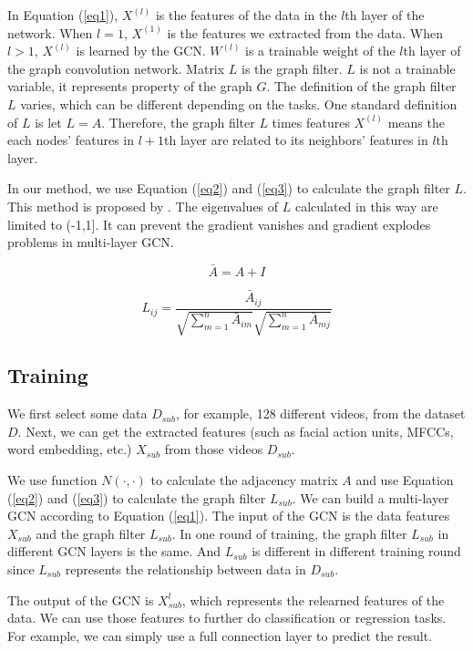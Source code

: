 \documentclass[11pt]{article}
\begin{document}
In Equation (\ref{eq1}), $X^{(l)}$ is the features of the data in the $l$th layer of the network.
When $l = 1$, $X^{(1)}$ is the features we extracted from the data. When $l>1$, $X^{(l)}$ is learned by the GCN.
$W^{(l)}$ is a trainable weight of the $l$th layer of the graph convolution network.
Matrix $L$ is the graph filter. $L$ is not a trainable variable, it represents property of the graph $G$. The definition of the graph filter $L$ varies, which can be different depending on the tasks. One standard definition of $L$ is let $L = A$. Therefore, the graph filter $L$ times features $X^{(l)}$ means the each nodes' features in $l+1$th layer are related to its neighbors' features in $l$th layer.

In our method, we use Equation (\ref{eq2}) and (\ref{eq3}) to calculate the graph filter $L$.
This method is proposed by \cite{kipf2017semi}. 
The eigenvalues of $L$ calculated in this way are limited to (-1,1]. It can prevent the 
gradient vanishes and gradient explodes problems in multi-layer GCN.

\begin{equation}
\bar{A}= A + I
\label{eq2}
\end{equation}

\begin{equation}
L_{ij}=\frac{\bar{A}_{ij}}{\sqrt{\sum_{m=1}^{n} \bar{A}_{im}}
\sqrt{\sum_{m=1}^{n} \bar{A}_{mj}}} 
\label{eq3}
\end{equation}

\subsection{Training}
We first select some data $D_{sub}$, for example, 128 different videos, from the dataset $D$. Next, we can
get the extracted features (such as facial action units, MFCCs, word embedding, etc.) $X_{sub}$ from those videos $D_{sub}$.

We use function $N(\cdot,\cdot)$  to calculate the adjacency matrix $A$ and use Equation (\ref{eq2}) and (\ref{eq3}) to calculate the graph filter $L_{sub}$. We can build a multi-layer GCN according to Equation (\ref{eq1}). The input of the GCN is the data features $X_{sub}$ and the graph filter $L_{sub}$. In one round of training, the graph filter $L_{sub}$ in different GCN layers is the same. And $L_{sub}$ is different in different training round since $L_{sub}$ represents the relationship between data in $D_{sub}$.

The output of the GCN is $X_{sub}^{l}$, which represents the relearned features of the data. We can use those features to further do classification or regression tasks. For example, we can simply use a full connection layer to predict the result.
\end{document}
